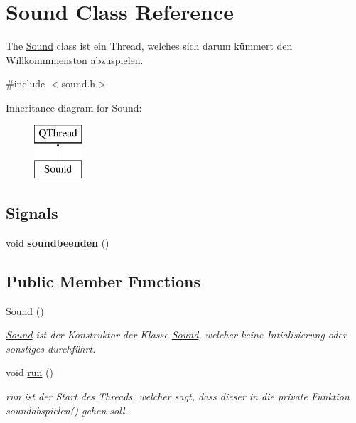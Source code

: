 \hypertarget{class_sound}{}\section{Sound Class Reference}
\label{class_sound}


The \hyperlink{class_sound}{Sound} class ist ein Thread, welches sich darum kümmert den Willkommmenston abzuspielen.  




{\ttfamily \#include $<$sound.\+h$>$}

Inheritance diagram for Sound\+:\begin{figure}[H]
\begin{center}
\leavevmode
\includegraphics[height=2.000000cm]{class_sound}
\end{center}
\end{figure}
\subsection*{Signals}
\begin{DoxyCompactItemize}
\item 
void {\bfseries soundbeenden} ()\hypertarget{class_sound_ae30710f9c93daa85e075c84360223116}{}\label{class_sound_ae30710f9c93daa85e075c84360223116}

\end{DoxyCompactItemize}
\subsection*{Public Member Functions}
\begin{DoxyCompactItemize}
\item 
\hyperlink{class_sound_a539c205cdf06fe2c621fd77c37bcfac9}{Sound} ()\hypertarget{class_sound_a539c205cdf06fe2c621fd77c37bcfac9}{}\label{class_sound_a539c205cdf06fe2c621fd77c37bcfac9}

\begin{DoxyCompactList}\small\item\em \hyperlink{class_sound}{Sound} ist der Konstruktor der Klasse \hyperlink{class_sound}{Sound}, welcher keine Intialisierung oder sonstiges durchführt. \end{DoxyCompactList}\item 
void \hyperlink{class_sound_a85b69a09be92807f00275229f7c22944}{run} ()\hypertarget{class_sound_a85b69a09be92807f00275229f7c22944}{}\label{class_sound_a85b69a09be92807f00275229f7c22944}

\begin{DoxyCompactList}\small\item\em run ist der Start des Threads, welcher sagt, dass dieser in die private Funktion soundabspielen() gehen soll. \end{DoxyCompactList}\end{DoxyCompactItemize}


